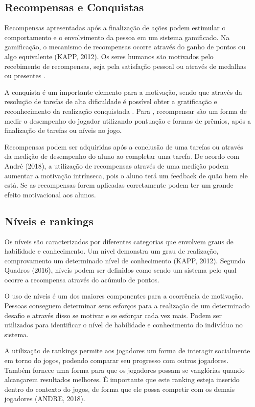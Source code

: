 \documentclass[
	12pt,				%
	oneside,			%
	a4paper,			%
	english,			%
	french,				%
	spanish,			%
	brazil,				%
	]{abntex2}
\begin{document}
\subsection{Recompensas e Conquistas}    

Recompensas apresentadas após a finalização de ações podem estimular o comportamento e o envolvimento da pessoa em um sistema gamificado. Na gamificação, o mecanismo de recompensas ocorre através do ganho de pontos ou algo equivalente (KAPP, 2012). Os seres humanos são motivados pelo recebimento de recompensas, seja pela satisfação pessoal ou através de medalhas ou presentes \cite{quadros2016gamificaccao}.

A conquista é um importante elemento para a motivação, sendo que através da resolução de tarefas de alta dificuldade é possível obter a gratificação e reconhecimento da realização conquistada \cite{quadros2016gamificaccao}. Para \citet{busarello2016gamificaccao}, recompensar são um forma de medir o desempenho do jogador utilizando pontuação e formas de prêmios, após a finalização de tarefas ou níveis no jogo.

Recompensas podem ser adquiridas após a conclusão de uma tarefas ou através da medição de desempenho do aluno ao completar uma tarefa. De acordo com André (2018), a utilização de recompensas através de uma medição podem aumentar a motivação intrínseca, pois o aluno terá um feedback de quão bem ele está. Se as recompensas forem aplicadas corretamente podem ter um grande efeito motivacional aos alunos.
    
\subsection{Níveis e rankings}        

Os níveis são caracterizados por diferentes categorias que envolvem graus de habilidade e conhecimento. Um nível demonstra um grau de realização, comprovamento um determinado nível de conhecimento (KAPP, 2012). Segundo Quadros (2016), níveis podem ser definidos como sendo um sistema pelo qual ocorre a recompensa através do acúmulo de pontos.

O uso de níveis é um dos maiores componentes para a ocorrência de motivação. Pessoas conseguem determinar seus esforços para a realização de um determinado desafio e através disso se motivar e se esforçar cada vez mais. Podem ser utilizados para identificar o nível de habilidade e conhecimento do indivíduo no sistema.

A utilização de rankings permite aos jogadores um forma de interagir socialmente em torno do jogos, podendo comparar seu progresso com outros jogadores. Também fornece uma forma para que os jogadores possam se vanglórias quando alcançarem resultados melhores. É importante que este ranking esteja inserido dentro do contexto do jogos, de forma que ele possa competir com os demais jogadores (ANDRE, 2018).
    
\end{document}

